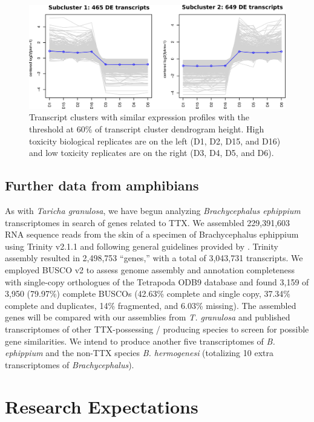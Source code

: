 \begin{figure}
    \centering
    \includegraphics[width=\textwidth]{figs/clusters.png}
    \caption{Transcript clusters with similar expression profiles with the threshold at 60\% of transcript cluster dendrogram height. High toxicity biological replicates are on the left (D1, D2, D15, and D16) and low toxicity replicates are on the right (D3, D4, D5, and D6).}
    \label{fig:clusters}
\end{figure}

\subsection{Further data from amphibians}

As with \textit{Taricha granulosa}, we have begun analyzing \textit{Brachycephalus ephippium} transcriptomes in search of genes related to TTX. We assembled 229,391,603 RNA sequence reads from the skin of a specimen of Brachycephalus ephippium using Trinity v2.1.1 \citep{grabherr2011trinity} and following general guidelines provided by \citep{haas2013novo}. Trinity assembly resulted in 2,498,753 ``genes,'' with a total of 3,043,731 transcripts. We employed BUSCO v2 \citep{simao2015busco} to assess genome assembly and annotation completeness with single-copy orthologues of the Tetrapoda ODB9 database and found 3,159 of 3,950 (79.97\%) complete BUSCOs (42.63\% complete and single copy, 37.34\% complete and duplicates, 14\% fragmented, and 6.03\% missing). The assembled genes will be compared with our assemblies from \textit{T. granulosa} and published transcriptomes of other TTX-possessing / producing species to screen for possible gene similarities. We intend to produce another five transcriptomes of \textit{B. ephippium} and the non-TTX species \textit{B. hermogenesi} (totalizing 10 extra transcriptomes of \textit{Brachycephalus}).

\section{Research Expectations}

